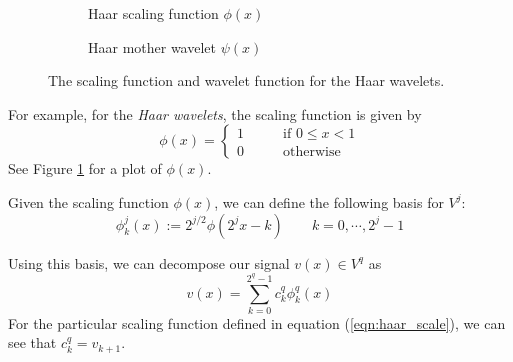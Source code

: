 \begin{figure}
  \centering
  \begin{subfigure}{0.4\textwidth}
    \centering
    \caption{Haar scaling function $\phi(x)$}
    \label{fig:haar_scaling}
  \end{subfigure}
  \begin{subfigure}{0.4\textwidth}
    \centering
    \caption{Haar mother wavelet $\psi(x)$}
    \label{fig:haar_mother}
  \end{subfigure}
  \caption{The scaling function and wavelet function for the Haar wavelets.}
  \label{fig:haar_1d}
\end{figure}

For example, for the \emph{Haar wavelets}, the scaling function is given by
\begin{equation}
  \label{eqn:haar_scale}
  \phi(x) = \left\{ \begin{array}{rl}
    1& \qquad \mbox{if $0\leq x < 1$}\\
    0& \qquad \mbox{otherwise}
  \end{array}\right.
\end{equation}
See Figure \ref{fig:haar_scaling} for a plot of $\phi(x)$.

Given the scaling function $\phi(x)$, we can define the following basis for $V^j$:
\begin{equation}
  \label{eqn:haar_scaling_basis}
  \phi_k^j(x) := 2^{j/2}\phi(2^j x-k) \qquad k = 0,\cdots, 2^j-1
\end{equation}

Using this basis, we can decompose our signal $v(x)\in V^q$ as 
\begin{equation*}
  v(x) = \sum_{k=0}^{2^q-1} c_k^q \phi_k^q(x)
\end{equation*}
For the particular scaling function defined in equation (\ref{eqn:haar_scale}), we can see that $c_k^q = v_{k+1}$.

